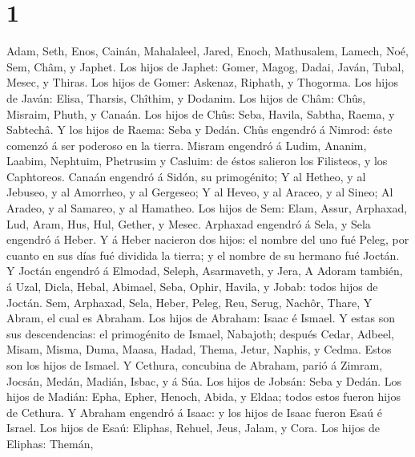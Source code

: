 \hypertarget{section}{%
\section{1}\label{section}}

 Adam, Seth, Enos,  Cainán, Mahalaleel, Jared,
 Enoch, Mathusalem, Lamech,  Noé, Sem, Châm, y
Japhet.  Los hijos de Japhet: Gomer, Magog, Dadai, Javán,
Tubal, Mesec, y Thiras.  Los hijos de Gomer: Askenaz,
Riphath, y Thogorma.  Los hijos de Javán: Elisa, Tharsis,
Chîthim, y Dodanim.  Los hijos de Châm: Chûs, Misraim,
Phuth, y Canaán.  Los hijos de Chûs: Seba, Havila, Sabtha,
Raema, y Sabtechâ. Y los hijos de Raema: Seba y Dedán. 
Chûs engendró á Nimrod: éste comenzó á ser poderoso en la tierra.
 Misram engendró á Ludim, Ananim, Laabim, Nephtuim,
 Phetrusim y Casluim: de éstos salieron los Filisteos, y
los Caphtoreos.  Canaán engendró á Sidón, su primogénito;
 Y al Hetheo, y al Jebuseo, y al Amorrheo, y al Gergeseo;
 Y al Heveo, y al Araceo, y al Sineo;  Al
Aradeo, y al Samareo, y al Hamatheo.  Los hijos de Sem:
Elam, Assur, Arphaxad, Lud, Aram, Hus, Hul, Gether, y Mesec.
 Arphaxad engendró á Sela, y Sela engendró á Heber.
 Y á Heber nacieron dos hijos: el nombre del uno fué Peleg,
por cuanto en sus días fué dividida la tierra; y el nombre de su hermano
fué Joctán.  Y Joctán engendró á Elmodad, Seleph,
Asarmaveth, y Jera,  A Adoram también, á Uzal, Dicla,
 Hebal, Abimael, Seba,  Ophir, Havila, y
Jobab: todos hijos de Joctán.  Sem, Arphaxad, Sela,
 Heber, Peleg, Reu,  Serug, Nachôr, Thare,
 Y Abram, el cual es Abraham.  Los hijos de
Abraham: Isaac é Ismael.  Y estas son sus descendencias: el
primogénito de Ismael, Nabajoth; después Cedar, Adbeel, Misam,
 Misma, Duma, Maasa, Hadad, Thema, Jetur, Naphis, y Cedma.
Estos son los hijos de Ismael.  Y Cethura, concubina de
Abraham, parió á Zimram, Jocsán, Medán, Madián, Isbac, y á Súa.
 Los hijos de Jobsán: Seba y Dedán.  Los hijos
de Madián: Epha, Epher, Henoch, Abida, y Eldaa; todos estos fueron hijos
de Cethura.  Y Abraham engendró á Isaac: y los hijos de
Isaac fueron Esaú é Israel.  Los hijos de Esaú: Eliphas,
Rehuel, Jeus, Jalam, y Cora.  Los hijos de Eliphas: Themán,
